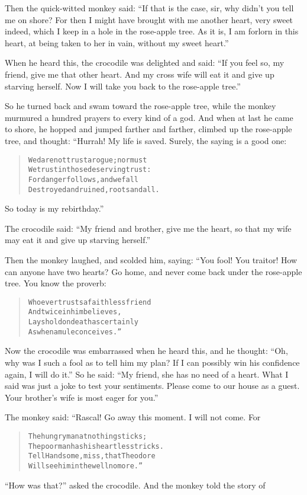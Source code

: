 \documentclass[article, twoside, 14pt]{memoir}
\renewenvironment{verbatim}{%
\begin{quote}%
\vskip -10pt%
\begin{alltt}\normalfont\large}{\end{alltt}%
\end{quote}%
\vskip -10pt
} %
\begin{document}
Then the quick-witted monkey said:
``If that is the case, sir, why didn't you tell me on shore? For then I might have brought with me another heart, very sweet indeed, which I keep in a hole in the rose-apple tree. As it is, I am forlorn in this heart, at being taken to her in vain, without my sweet heart.''

When he heard this, the crocodile was delighted and said:
``If you feel so, my friend, give me that other heart. And my cross wife will eat it and give up starving herself. Now I will take you back to the rose-apple tree.''

So he turned back and swam toward the rose-apple tree, while the
monkey murmured a hundred prayers to every kind of a god. And when
at last he came to shore, he hopped and jumped farther and farther,
climbed up the rose-apple tree, and thought: “Hurrah! My life is
saved. Surely, the saying is a good one:

\begin{verbatim}
We dare not trust a rogue; nor must
We trust in those deserving trust:
For danger follows, and we fall
Destroyed and ruined, roots and all.
\end{verbatim}
So today is my rebirthday.”

The crocodile said:
``My friend and brother, give me the heart, so that my wife may eat it and give up starving herself.''

Then the monkey laughed, and scolded him, saying: “You fool! You
traitor! How can anyone have two hearts? Go home, and never come
back under the rose-apple tree. You know the proverb:

\begin{verbatim}
Whoever trusts a faithless friend
    And twice in him believes,
Lays hold on death as certainly
    As when a mule conceives.”
\end{verbatim}
Now the crocodile was embarrassed when he heard this, and he
thought:
``Oh, why was I such a fool as to tell him my plan? If I can possibly win his confidence again, I will do it.''
So he said:
``My friend, she has no need of a heart. What I said was just a joke to test your sentiments. Please come to our house as a guest. Your brother's wife is most eager for you.''

The monkey said: “Rascal! Go away this moment. I will not come.
For

\begin{verbatim}
The hungry man at nothing sticks;
The poor man has his heartless tricks.
Tell Handsome, miss, that Theodore
Will see him in the well no more.”
\end{verbatim}
``How was that?'' asked the crocodile. And the monkey told the
story of
\end{document}
